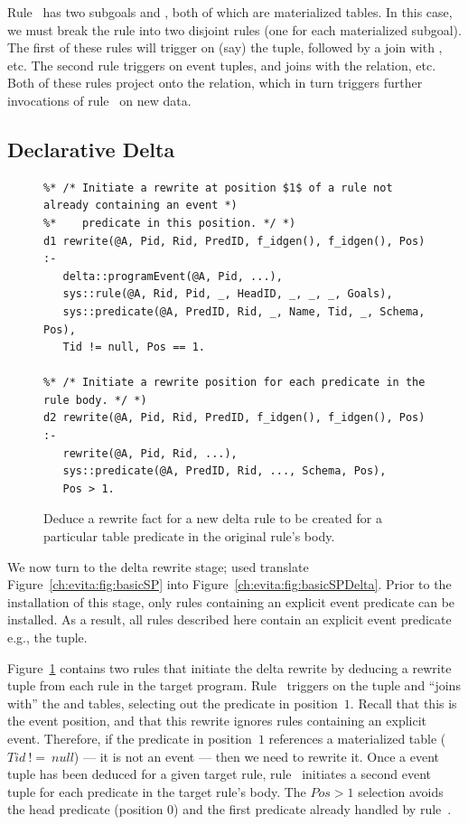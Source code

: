 Rule~ has two subgoals  and , both of which are
materialized tables.  In this case, we must break the rule into two disjoint
rules (one for each materialized subgoal).  The first of these rules will
trigger on (say) the  tuple, followed by a join with , etc.
The second rule triggers on  event tuples, and joins with the
 relation, etc.  Both of these rules project onto the 
relation, which in turn triggers further invocations of rule~ on new
 data.

\subsection{Declarative Delta}

\begin{figure}[!t]
\ssp
\centering
\begin{lstlisting}
%* /* Initiate a rewrite at position $1$ of a rule not already containing an event *)
%*    predicate in this position. */ *)
d1 rewrite(@A, Pid, Rid, PredID, f_idgen(), f_idgen(), Pos) :-
   delta::programEvent(@A, Pid, ...), 
   sys::rule(@A, Rid, Pid, _, HeadID, _, _, _, Goals),
   sys::predicate(@A, PredID, Rid, _, Name, Tid, _, Schema, Pos),
   Tid != null, Pos == 1.

%* /* Initiate a rewrite position for each predicate in the rule body. */ *)
d2 rewrite(@A, Pid, Rid, PredID, f_idgen(), f_idgen(), Pos) :-
   rewrite(@A, Pid, Rid, ...),
   sys::predicate(@A, PredID, Rid, ..., Schema, Pos),
   Pos > 1.
\end{lstlisting}
\caption{\label{ch:evita:fig:delta1}Deduce a rewrite fact for a new delta rule to be
created for a particular table predicate in the original rule's body.}
\end{figure}

We now turn to the delta rewrite \OVERLOG stage; used translate
Figure~\ref{ch:evita:fig:basicSP} into Figure~\ref{ch:evita:fig:basicSPDelta}.
Prior to the installation of this stage, only rules containing an explicit
event predicate can be installed.  As a result, all rules described here
contain an explicit event predicate e.g., the  tuple.

Figure~\ref{ch:evita:fig:delta1} contains two rules that initiate the delta
rewrite by deducing a rewrite tuple from each rule in the target program.
Rule~ triggers on the  tuple and ``joins with''
the  and  tables, selecting out the predicate in
position~$1$.  Recall that this is the event position, and that this rewrite
ignores rules containing an explicit event.  Therefore, if the predicate in
position~$1$ references a materialized table ($Tid\ !=\ null$) --- it is not an
event --- then we need to rewrite it.  Once a  event tuple has been
deduced for a given target rule, rule~ initiates a second 
event tuple for each predicate in the target rule's body.  The $Pos > 1$
selection avoids the head predicate (position $0$) and the first predicate
already handled by rule~.

